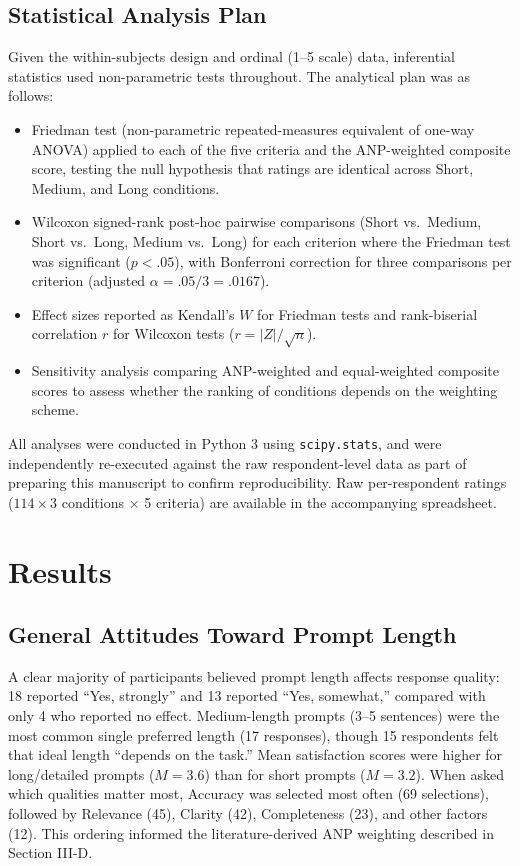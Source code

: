 \documentclass[conference]{IEEEtran}
\begin{document}
\subsection{Statistical Analysis Plan}
Given the within-subjects design and ordinal (1--5 scale) data, inferential statistics used non-parametric tests throughout. The analytical plan was as follows:
\begin{itemize}
\item Friedman test (non-parametric repeated-measures equivalent of one-way ANOVA) applied to each of the five criteria and the ANP-weighted composite score, testing the null hypothesis that ratings are identical across Short, Medium, and Long conditions.
\item Wilcoxon signed-rank post-hoc pairwise comparisons (Short vs.\ Medium, Short vs.\ Long, Medium vs.\ Long) for each criterion where the Friedman test was significant ($p<.05$), with Bonferroni correction for three comparisons per criterion (adjusted $\alpha = .05/3 = .0167$).
\item Effect sizes reported as Kendall's $W$ for Friedman tests and rank-biserial correlation $r$ for Wilcoxon tests ($r = |Z|/\sqrt{n}$).
\item Sensitivity analysis comparing ANP-weighted and equal-weighted composite scores to assess whether the ranking of conditions depends on the weighting scheme.
\end{itemize}

All analyses were conducted in Python 3 using \texttt{scipy.stats}, and were independently re-executed against the raw respondent-level data as part of preparing this manuscript to confirm reproducibility. Raw per-respondent ratings ($114 \times 3$ conditions $\times$ 5 criteria) are available in the accompanying spreadsheet.

\section{Results}

\subsection{General Attitudes Toward Prompt Length}
A clear majority of participants believed prompt length affects response quality: 18 reported ``Yes, strongly'' and 13 reported ``Yes, somewhat,'' compared with only 4 who reported no effect. Medium-length prompts (3--5 sentences) were the most common single preferred length (17 responses), though 15 respondents felt that ideal length ``depends on the task.'' Mean satisfaction scores were higher for long/detailed prompts ($M=3.6$) than for short prompts ($M=3.2$). When asked which qualities matter most, Accuracy was selected most often (69 selections), followed by Relevance (45), Clarity (42), Completeness (23), and other factors (12). This ordering informed the literature-derived ANP weighting described in Section III-D.
\end{document}
